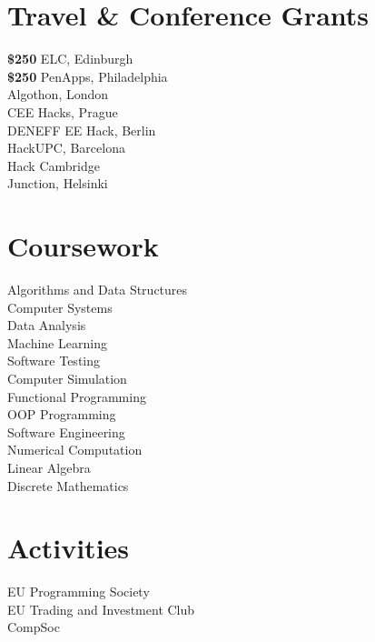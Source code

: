 \documentclass[]{deedy-resume-openfont}
\begin{document}
\begin{minipage}[t]{0.33\textwidth}
\section{Travel \& Conference Grants}

\textbf{\$250 } ELC, Edinburgh \\
\textbf{\$250 } PenApps, Philadelphia \\
\textbf{ } Algothon, London \\
\textbf{ } CEE Hacks, Prague\\
\textbf{ } DENEFF EE Hack, Berlin\\
\textbf{ } HackUPC, Barcelona\\
\textbf{  } Hack Cambridge \\
\textbf{    } Junction, Helsinki


\section{Coursework}
Algorithms and Data Structures \\
Computer Systems \\
Data Analysis \\
Machine Learning \\
Software Testing \\
Computer Simulation \\
Functional Programming \\
OOP Programming \\
Software Engineering \\
Numerical Computation \\
Linear Algebra \\
Discrete Mathematics 


\section{Activities}
EU Programming Society \\
EU Trading and Investment Club \\
CompSoc \\

\end{minipage}%
\end{document}
